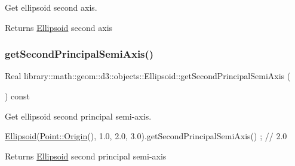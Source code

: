 Get ellipsoid second axis. 

\begin{DoxyReturn}{Returns}
\hyperlink{classlibrary_1_1math_1_1geom_1_1d3_1_1objects_1_1_ellipsoid}{Ellipsoid} second axis 
\end{DoxyReturn}
\mbox{\label{classlibrary_1_1math_1_1geom_1_1d3_1_1objects_1_1_ellipsoid_abdc2cc0bed7d473f0d4f572afd0de054}} 
\subsubsection{\texorpdfstring{get\+Second\+Principal\+Semi\+Axis()}{getSecondPrincipalSemiAxis()}}
{\footnotesize\ttfamily Real library\+::math\+::geom\+::d3\+::objects\+::\+Ellipsoid\+::get\+Second\+Principal\+Semi\+Axis (\begin{DoxyParamCaption}{ }\end{DoxyParamCaption}) const}



Get ellipsoid second principal semi-\/axis. 


\begin{DoxyCode}
\hyperlink{classlibrary_1_1math_1_1geom_1_1d3_1_1objects_1_1_ellipsoid_aae81fe0edc7f0e8d4590ea89ae73cb14}{Ellipsoid}(\hyperlink{classlibrary_1_1math_1_1geom_1_1d3_1_1objects_1_1_point_ab2a38e285c562e50bf350272c083986f}{Point::Origin}(), 1.0, 2.0, 3.0).getSecondPrincipalSemiAxis() ; \textcolor{comment}{// 2.0}
\end{DoxyCode}


\begin{DoxyReturn}{Returns}
\hyperlink{classlibrary_1_1math_1_1geom_1_1d3_1_1objects_1_1_ellipsoid}{Ellipsoid} second principal semi-\/axis 
\end{DoxyReturn}
\mbox{\label{classlibrary_1_1math_1_1geom_1_1d3_1_1objects_1_1_ellipsoid_a12dc0fd72c672b3d78ec9a286db30c70}} 
